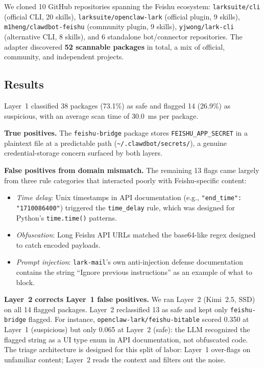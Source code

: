 \documentclass[sigconf,nonacm]{acmart}
\begin{document}
We cloned 10 GitHub repositories spanning the Feishu ecosystem: \texttt{larksuite/cli} (official CLI, 20 skills), \texttt{larksuite/openclaw-lark} (official plugin, 9 skills), \texttt{m1heng/clawdbot-feishu} (community plugin, 9 skills), \texttt{yjwong/lark-cli} (alternative CLI, 8 skills), and 6 standalone bot/connector repositories. The adapter discovered \textbf{52 scannable packages} in total, a mix of official, community, and independent projects.

\subsection{Results}

Layer~1 classified 38 packages (73.1\%) as safe and flagged 14 (26.9\%) as suspicious, with an average scan time of 30.0~ms per package.

\textbf{True positives.} The \texttt{feishu-bridge} package stores \texttt{FEISHU\_APP\_SECRET} in a plaintext file at a predictable path (\texttt{\textasciitilde/.clawdbot/secrets/}), a genuine credential-storage concern surfaced by both layers.

\textbf{False positives from domain mismatch.} The remaining 13 flags came largely from three rule categories that interacted poorly with Feishu-specific content:
\begin{itemize}
    \item \emph{Time delay}: Unix timestamps in API documentation (e.g., \texttt{"end\_time": "1710086400"}) triggered the \texttt{time\_delay} rule, which was designed for Python's \texttt{time.time()} patterns.
    \item \emph{Obfuscation}: Long Feishu API URLs matched the base64-like regex designed to catch encoded payloads.
    \item \emph{Prompt injection}: \texttt{lark-mail}'s own anti-injection defense documentation contains the string ``Ignore previous instructions'' as an example of what to block.
\end{itemize}

\textbf{Layer~2 corrects Layer~1 false positives.} We ran Layer~2 (Kimi~2.5, SSD) on all 14 flagged packages. Layer~2 reclassified 13 as safe and kept only \texttt{feishu-bridge} flagged. For instance, \texttt{openclaw-lark/feishu-bitable} scored 0.350 at Layer~1 (suspicious) but only 0.065 at Layer~2 (safe): the LLM recognized the flagged string as a UI type enum in API documentation, not obfuscated code. The triage architecture is designed for this split of labor: Layer~1 over-flags on unfamiliar content; Layer~2 reads the context and filters out the noise.
\end{document}
